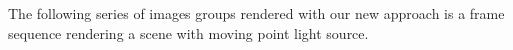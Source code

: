 The following series of images groups rendered with our new approach is a frame sequence rendering a scene with moving point light source. %

\begin{figure}

\begin{center}
\setlength{\tabcolsep}{0mm}
\end{center}
\end{figure}
